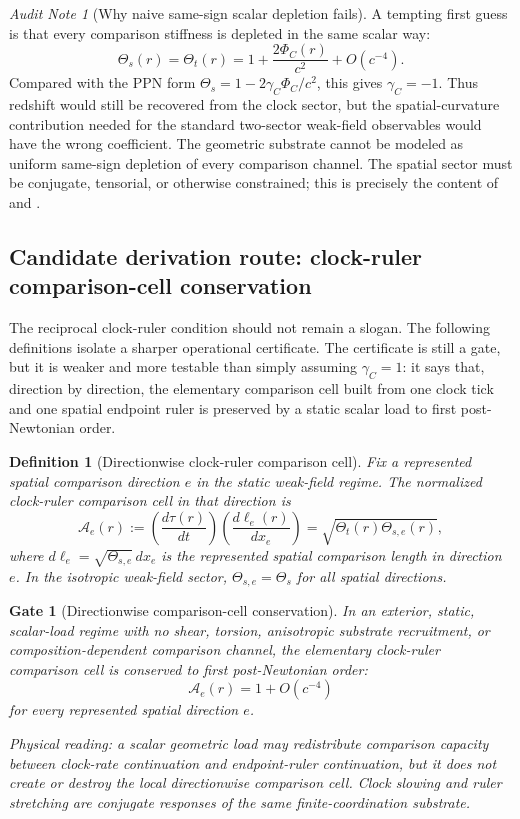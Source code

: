 \documentclass[11pt]{article}
\newtheorem{definition}[theorem]{Definition}
\newtheorem{gate}[theorem]{Gate}
\theoremstyle{remark}
\newtheorem{audit}[theorem]{Audit Note}
\begin{document}
\begin{audit}[Why naive same-sign scalar depletion fails]
A tempting first guess is that every comparison stiffness is depleted in the same scalar way:
\[
        \Theta_s(r)=\Theta_t(r)=1+\frac{2\Phi_C(r)}{c^2}+O(c^{-4}).
\]
Compared with the PPN form \(\Theta_s=1-2\gamma_C\Phi_C/c^2\), this gives \(\gamma_C=-1\).  Thus redshift would still be recovered from the clock sector, but the spatial-curvature contribution needed for the standard two-sector weak-field observables would have the wrong coefficient.  The geometric substrate cannot be modeled as uniform same-sign depletion of every comparison channel.  The spatial sector must be conjugate, tensorial, or otherwise constrained; this is precisely the content of  and .
\end{audit}

\subsection{Candidate derivation route: clock-ruler comparison-cell conservation}

The reciprocal clock-ruler condition should not remain a slogan.  The following definitions isolate a sharper operational certificate.  The certificate is still a gate, but it is weaker and more testable than simply assuming \(\gamma_C=1\): it says that, direction by direction, the elementary comparison cell built from one clock tick and one spatial endpoint ruler is preserved by a static scalar load to first post-Newtonian order.

\begin{definition}[Directionwise clock-ruler comparison cell]
Fix a represented spatial comparison direction \(e\) in the static weak-field regime.  The normalized clock-ruler comparison cell in that direction is
\[
        \mathcal A_e(r)
        :=
        \left(\frac{d\tau(r)}{dt}\right)
        \left(\frac{d\ell_e(r)}{dx_e}\right)
        =
        \sqrt{\Theta_t(r)\Theta_{s,e}(r)},
\]
where \(d\ell_e=\sqrt{\Theta_{s,e}}\,dx_e\) is the represented spatial comparison length in direction \(e\).  In the isotropic weak-field sector, \(\Theta_{s,e}=\Theta_s\) for all spatial directions.
\end{definition}

\begin{gate}[Directionwise comparison-cell conservation]
\label{gate:cell-conservation}
In an exterior, static, scalar-load regime with no shear, torsion, anisotropic substrate recruitment, or composition-dependent comparison channel, the elementary clock-ruler comparison cell is conserved to first post-Newtonian order:
\[
        \mathcal A_e(r)=1+O(c^{-4})
\]
for every represented spatial direction \(e\).

Physical reading: a scalar geometric load may redistribute comparison capacity between clock-rate continuation and endpoint-ruler continuation, but it does not create or destroy the local directionwise comparison cell.  Clock slowing and ruler stretching are conjugate responses of the same finite-coordination substrate.
\end{gate}
\end{document}
